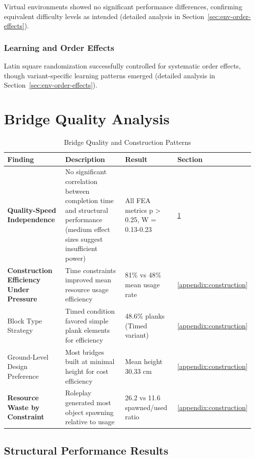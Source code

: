 Virtual environments showed no significant performance differences, confirming equivalent difficulty levels as intended (detailed analysis in Section~\ref{sec:env-order-effects}).

\subsubsection{Learning and Order Effects}\label{sec:learning}

Latin square randomization successfully controlled for systematic order effects, though variant-specific learning patterns emerged (detailed analysis in Section~\ref{sec:env-order-effects}).

\section{Bridge Quality Analysis}\label{sec:bridge_quality}

\begin{table}[!t]
\centering
\caption{Bridge Quality and Construction Patterns}
\label{tab:bridge_construction_summary}
\begin{tabular}{@{}p{3.2cm}p{5.5cm}p{3.2cm}p{2.3cm}@{}}
\toprule
\textbf{Finding} & \textbf{Description} & \textbf{Result} & \textbf{Section} \\
\midrule
\textbf{Quality-Speed Independence} & No significant correlation between completion time and structural performance (medium effect sizes suggest insufficient power) & All FEA metrics p > 0.25, W = 0.13-0.23 & \ref{sec:bridge_quality} \\
\textbf{Construction Efficiency Under Pressure} & Time constraints improved mean resource usage efficiency & 81\% vs 48\% mean usage rate & \ref{appendix:construction} \\
Block Type Strategy & Timed condition favored simple plank elements for efficiency & 48.6\% planks (Timed variant) & \ref{appendix:construction} \\
Ground-Level Design Preference & Most bridges built at minimal height for cost efficiency & Mean height 30.33 cm & \ref{appendix:construction} \\
\textbf{Resource Waste by Constraint} & Roleplay generated most object spawning relative to usage & 26.2 vs 11.6 spawned/used ratio & \ref{appendix:construction} \\
\bottomrule
\end{tabular}
\end{table}

\subsection{Structural Performance Results}

